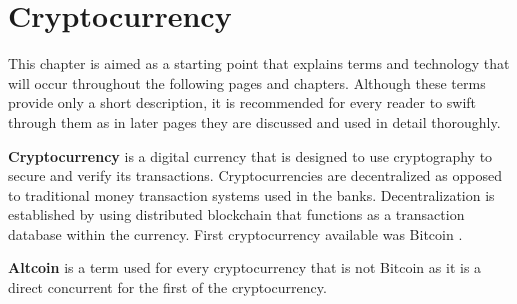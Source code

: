 \documentclass[
  printed, %
  table,   %
  lof,     %
  lot,     %
           oneside, color
]{fithesis3}
\begin{document}


\chapter{Cryptocurrency}
This chapter is aimed as a starting point that explains terms and technology that will occur throughout the following pages and chapters. Although these terms provide only a short description, it is recommended for every reader to swift through them as in later pages they are discussed and used in detail thoroughly.

\textbf{Cryptocurrency} is a digital currency that is designed to use cryptography to secure and verify its transactions. Cryptocurrencies are decentralized as opposed to traditional money transaction systems used in the banks. Decentralization is established by using distributed blockchain that functions as a transaction database within the currency. First cryptocurrency available was Bitcoin \cite{farell2015analysis}.

\textbf{Altcoin} is a term used for every cryptocurrency that is not Bitcoin as it is a direct concurrent for the first of the cryptocurrency.
\end{document}
